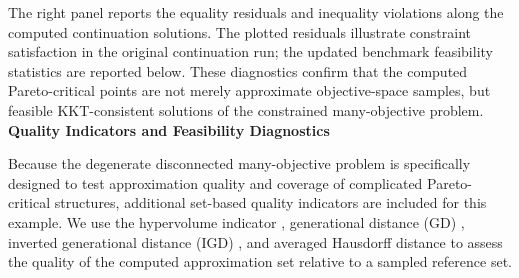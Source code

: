 \documentclass[11pt,pdflatex,sn-mathphys-ay]{sn-jnl}%
\theoremstyle{definition}
\theoremstyle{thmstyleone}%
\theoremstyle{thmstyletwo}%
\theoremstyle{thmstylethree}%
\newcommand{\add}[1]{\textcolor{revisionblue}{#1}}
\begin{document}
	The right panel reports the equality residuals and inequality violations along the computed continuation solutions. The plotted residuals illustrate constraint satisfaction in the original continuation run; the updated benchmark feasibility statistics are reported below. These diagnostics confirm that the computed Pareto-critical points are not merely approximate objective-space samples, but feasible KKT-consistent solutions of the constrained many-objective problem.
	\medskip \noindent \textbf{Quality Indicators and Feasibility Diagnostics}
	
	Because the degenerate disconnected many-objective problem is specifically designed to test approximation quality and coverage of complicated Pareto-critical structures, additional set-based quality indicators are included for this example. 
	\add{We use the hypervolume indicator
		\cite{zitzler1999multiobjective}, generational
		distance (GD) \cite{vanveldhuizen1999multiobjective},
		inverted generational distance (IGD)
		\cite{ishibuchi2015modified}, and averaged
		Hausdorff distance \cite{schutze2012using}
		to assess the quality of the computed
		approximation set relative to a sampled
		reference set.}
	
\end{document}
